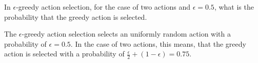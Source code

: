 
\begin{exercise}[Exercise 2.1]

In $\epsilon$-greedy action selection, for the case of two actions and $\epsilon = 0.5$,
what is the probability that the greedy action is selected.

\end{exercise}


\begin{solution}

The $\epsilon$-greedy action selection selects an uniformly random action with a probability of
$\epsilon = 0.5$. In the case of two actions, this means, that the greedy action
is selected with a probability of $\frac{\epsilon}{2} + (1 - \epsilon) = 0.75$.

\end{solution}

